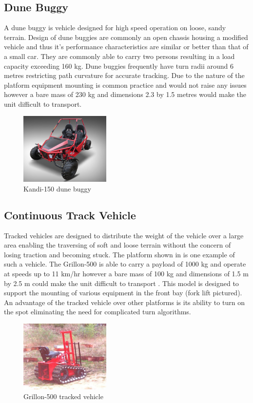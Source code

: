 \documentclass[main.tex]{subfiles}
\begin{document}
\subsection{Dune Buggy}
A dune buggy is vehicle designed for high speed operation on loose, sandy terrain. Design of dune buggies are commonly an open chassis housing a modified vehicle and thus it's performance characteristics are similar or better than that of a small car. They are commonly able to carry two persons resulting in a load capacity exceeding 160 kg. Dune buggies frequently have turn radii around 6 metres restricting path curvature for accurate tracking. Due to the nature of the platform equipment mounting is common practice and would not raise any issues however a bare mass of 230 kg and dimensions 2.3 by 1.5 metres would make the unit difficult to transport.
\begin{figure}[ht]
\includegraphics[width=0.4\textwidth]{4-ConceptDesign/kandidunebuggy.jpg}
\centering
\caption[Kandi-150 dune buggy]{Kandi-150 dune buggy \parencite{150GKM}} 
\end{figure}

\subsection{Continuous Track Vehicle}
Tracked vehicles are designed to distribute the weight of the vehicle over a large area enabling the traversing of soft and loose terrain without the concern of losing traction and becoming stuck. The platform shown in  is one example of such a vehicle. The Grillon-500 is able to carry a payload of 1000 kg and operate at speeds up to 11 km/hr however a bare mass of 100 kg and dimensions of 1.5 m by 2.5 m could make the unit difficult to transport \parencite{cinamGrillon}. This model is designed to support the mounting of various equipment in the front bay (fork lift pictured). An advantage of the tracked vehicle over other platforms is its ability to turn on the spot eliminating the need for complicated turn algorithms. 
\begin{figure}[ht]
\includegraphics[width=0.4\textwidth]{4-ConceptDesign/Grillon-500.jpg}
\centering
\caption[Grillon-500 tracked vehicle]{Grillon-500 tracked vehicle \parencite{cinamGrillon}} 
\end{figure}
\end{document}
